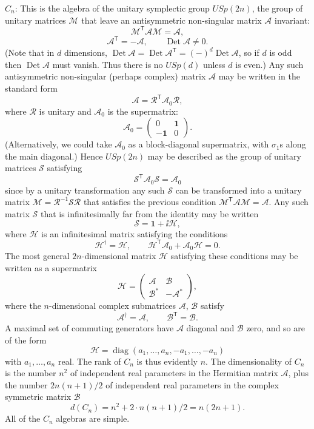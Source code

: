 \noindent
$C_n$: This is the algebra of the unitary symplectic group $USp(2n)$, the group
of unitary matrices $\mathcal M$ that leave an antisymmetric non-singular matrix
$\mathcal A$ invariant:
\[
 \mathcal M^{\mathsf T}\mathcal A\mathcal M=\mathcal A ,
\]
\[
 \mathcal A^{\mathsf T}=-\mathcal A,\qquad \operatorname{Det}\mathcal A\ne0 .
\]
(Note that in $d$ dimensions,
$\operatorname{Det}\mathcal A=\operatorname{Det}\mathcal A^{\mathsf T}
=(-)^d\operatorname{Det}\mathcal A$, so if $d$ is odd then
$\operatorname{Det}\mathcal A$ must vanish. Thus there is no $USp(d)$ unless
$d$ is even.) Any such antisymmetric non-singular (perhaps complex) matrix
$\mathcal A$ may be written in the standard form
\[
 \mathcal A=\mathcal R^{\mathsf T}\mathcal A_0\mathcal R ,
\]
where $\mathcal R$ is unitary and $\mathcal A_0$ is the supermatrix:
\[
 \mathcal A_0=\begin{pmatrix}0&\mathbf{1}\\-\mathbf{1}&0\end{pmatrix} .
\]
(Alternatively, we could take $\mathcal A_0$ as a block-diagonal supermatrix,
with $\sigma_1$s along the main diagonal.) Hence $USp(2n)$ may be described as
the group of unitary matrices $\mathcal S$ satisfying
\[
 \mathcal S^{\mathsf T}\mathcal A_0\mathcal S=\mathcal A_0
\]
since by a unitary transformation any such $\mathcal S$ can be transformed into
a unitary matrix $\mathcal M=\mathcal R^{-1}\mathcal S\mathcal R$ that satisfies
the previous condition $\mathcal M^{\mathsf T}\mathcal A\mathcal M=\mathcal A$. Any such
matrix $\mathcal S$ that is infinitesimally far from the identity may be written
\[
 \mathcal S=\mathbf{1}+\ii\mathcal H ,
\]
where $\mathcal H$ is an infinitesimal matrix satisfying the conditions
\[
 \mathcal H^\dagger=\mathcal H,\qquad
 \mathcal H^{\mathsf T}\mathcal A_0+\mathcal A_0\mathcal H=0 .
\]
The most general $2n$-dimensional matrix $\mathcal H$ satisfying these conditions
may be written as a supermatrix
\[
 \mathcal H=\begin{pmatrix}
  \mathcal A&\mathcal B\\
  \mathcal B^*&-\mathcal A^*
 \end{pmatrix} ,
\]
where the $n$-dimensional complex submatrices $\mathcal A$, $\mathcal B$ satisfy
\[
 \mathcal A^\dagger=\mathcal A,\qquad \mathcal B^{\mathsf T}=\mathcal B .
\]
A maximal set of commuting generators have $\mathcal A$ diagonal and
$\mathcal B$ zero, and so are of the form
\[
 \mathcal H=\operatorname{diag}(a_1,\ldots,a_n,-a_1,\ldots,-a_n)
\]
with $a_1,\ldots,a_n$ real. The rank of $C_n$ is thus evidently $n$. The
dimensionality of $C_n$ is the number $n^2$ of independent real parameters in the
Hermitian matrix $\mathcal A$, plus the number $2n(n+1)/2$ of independent real
parameters in the complex symmetric matrix $\mathcal B$
\[
 d(C_n)=n^2+2\cdot n(n+1)/2=n(2n+1) .
\]
All of the $C_n$ algebras are simple.

